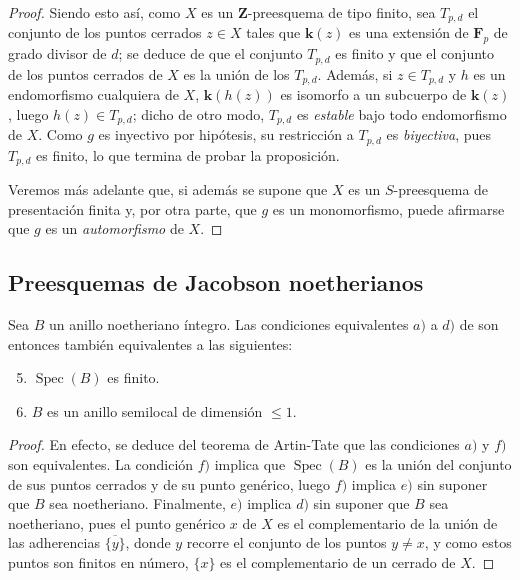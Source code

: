 \begin{proof}
Siendo esto así, como $X$ es un $\mathbf{Z}$-preesquema de tipo finito, sea $T_{p,d}$ el conjunto de los puntos cerrados $z\in X$ tales que $\boldsymbol k(z)$ es una extensión de $\mathbf{F}_p$ de grado divisor de $d$; se deduce de  que el conjunto $T_{p,d}$ es finito y que el conjunto de los puntos cerrados de $X$ es la unión de los $T_{p,d}$.
Además, si $z\in T_{p,d}$ y $h$ es un endomorfismo cualquiera de $X$, $\boldsymbol k(h(z))$ es isomorfo a un subcuerpo de $\boldsymbol k(z)$, luego $h(z)\in T_{p,d}$; dicho de otro modo, $T_{p,d}$ es \emph{estable} bajo todo endomorfismo de $X$.
Como $g$ es inyectivo por hipótesis, su restricción a $T_{p,d}$ es \emph{biyectiva}, pues $T_{p,d}$ es finito, lo que termina de probar la proposición.

Veremos más adelante  que, si además se supone que $X$ es un $S$-preesquema de presentación finita y, por otra parte, que $g$ es un monomorfismo, puede afirmarse que $g$ es un \emph{automorfismo} de $X$.
\end{proof}

\subsection{Preesquemas de Jacobson noetherianos}
\label{subsection:IV.10.5}

\begin{proposition}[10.5.1]
\label{IV.10.5.1}
Sea $B$ un anillo noetheriano íntegro.
Las condiciones equivalentes $a)$ a $d)$ de  son entonces también equivalentes a las siguientes:
\begin{enumerate}[label=\alph*)]
  \setcounter{enumi}{4}
  \item $\operatorname{Spec}(B)$ es finito.
  \item $B$ es un anillo semilocal de dimensión $\leq 1$.
\end{enumerate}
\end{proposition}

\begin{proof}
En efecto, se deduce del teorema de Artin-Tate  que las condiciones $a)$ y $f)$ son equivalentes.
La condición $f)$ implica que $\operatorname{Spec}(B)$ es la unión del conjunto de sus puntos cerrados y de su punto genérico, luego $f)$ implica $e)$ sin suponer que $B$ sea noetheriano.
Finalmente, $e)$ implica $d)$ sin suponer que $B$ sea noetheriano, pues el punto genérico $x$ de $X$ es el complementario de la unión de las adherencias $\overline{\{y\}}$, donde $y$ recorre el conjunto de los puntos $y\neq x$, y como estos puntos son finitos en número, $\{x\}$ es el complementario de un cerrado de $X$.
\end{proof}

